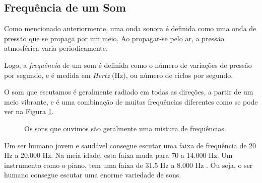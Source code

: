 \documentclass[
    12pt,               %
    openright,          %
    oneside,
    a4paper,            
    english,            %
    brazil              %
    ]{abntex2}
\begin{document}
\subsection{Frequência de um Som}

Como mencionado anteriormente, uma onda sonora é definida como uma onda de pressão que se propaga por um meio. Ao propagar-se pelo ar, a pressão atmosférica varia periodicamente.

Logo, a \textit{frequência} de um som é definida como o número de variações de pressão por segundo, e é medida em \textit{Hertz} (Hz), ou número de ciclos por segundo.


O som que escutamos é geralmente radiado em todas as direções, a partir de um meio vibrante, e é uma combinação de muitas frequências diferentes como se pode ver na Figura \ref{complexos}.

\begin{figure}[!htb]
  \caption{\label{complexos}Os sons que ouvimos são geralmente uma mistura de frequências.}
  \begin{center}
  \end{center}
\end{figure}

Um ser humano jovem e saudável consegue escutar uma faixa de frequência de 20 Hz a 20.000 Hz. Na meia idade, esta faixa muda para 70 a 14.000 Hz. Um instrumento como o piano, tem uma faixa de 31.5 Hz a 8.000 Hz \cite{control}. Ou seja, o ser humano consegue escutar uma enorme variedade de sons. 
\end{document}
